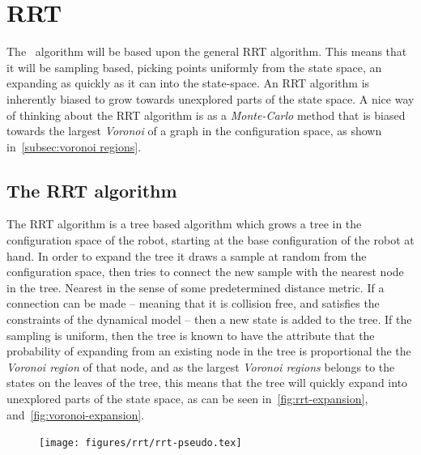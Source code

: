 \chapter{RRT}

The \rrtfunnel\ algorithm will be based upon the general \ac{RRT}
algorithm\cite[LaValle]{article}. This means that it will be sampling based,
picking points uniformly from the state space, an expanding as quickly as it can
into the state-space. An \ac{RRT} algorithm is inherently biased to grow towards
unexplored parts of the state space. A nice way of thinking about the \ac{RRT}
algorithm is as a \textit{Monte-Carlo} method that is biased towards the largest
\textit{Voronoi} of a graph in the configuration space, as shown
in~\ref{subsec:voronoi regions}. 

\section{The RRT algorithm}

The \ac{RRT} algorithm is a tree based algorithm which grows a tree in the
configuration space of the robot, starting at the base configuration of the
robot at hand. In order to expand the tree it draws a sample at random from the
configuration space, then tries to connect the new sample with the nearest node
in the tree. Nearest in the sense of some predetermined distance metric. If a
connection can be made -- meaning that it is collision free, and satisfies the
constraints of the dynamical model -- then a new state is added to the tree. If
the sampling is uniform, then the tree is known to have the attribute that the
probability of expanding from an existing node in the tree is proportional the
the \textit{Voronoi region} of that node, and as the largest \textit{Voronoi
  regions} belongs to the states on the leaves of the tree, this means that the
tree will quickly expand into unexplored parts of the state space, as can be
seen in~\ref{fig:rrt-expansion}, and~\ref{fig:voronoi-expansion}.

\begin{figure}
  \texttt{[image: figures/rrt/rrt-pseudo.tex]} %
\end{figure}

